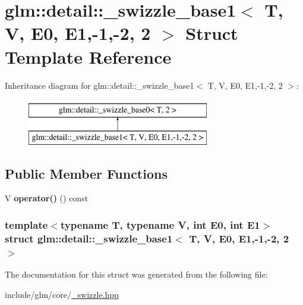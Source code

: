 \hypertarget{structglm_1_1detail_1_1__swizzle__base1_3_01T_00_01V_00_01E0_00_01E1_00-1_00-2_00_012_01_4}{\section{glm\-:\-:detail\-:\-:\-\_\-swizzle\-\_\-base1$<$ \-T, \-V, \-E0, \-E1,-\/1,-\/2, 2 $>$ \-Struct \-Template \-Reference}
\label{structglm_1_1detail_1_1__swizzle__base1_3_01T_00_01V_00_01E0_00_01E1_00-1_00-2_00_012_01_4}
}
\-Inheritance diagram for glm\-:\-:detail\-:\-:\-\_\-swizzle\-\_\-base1$<$ \-T, \-V, \-E0, \-E1,-\/1,-\/2, 2 $>$\-:\begin{figure}[H]
\begin{center}
\leavevmode
\includegraphics[height=2.000000cm]{structglm_1_1detail_1_1__swizzle__base1_3_01T_00_01V_00_01E0_00_01E1_00-1_00-2_00_012_01_4}
\end{center}
\end{figure}
\subsection*{\-Public \-Member \-Functions}
\begin{DoxyCompactItemize}
\item 
\hypertarget{structglm_1_1detail_1_1__swizzle__base1_3_01T_00_01V_00_01E0_00_01E1_00-1_00-2_00_012_01_4_ae62c208420fe971c7203cbea2a7b7481}{\-V {\bfseries operator()} () const }\label{structglm_1_1detail_1_1__swizzle__base1_3_01T_00_01V_00_01E0_00_01E1_00-1_00-2_00_012_01_4_ae62c208420fe971c7203cbea2a7b7481}

\end{DoxyCompactItemize}
\subsubsection*{template$<$typename T, typename V, int \-E0, int \-E1$>$ struct glm\-::detail\-::\-\_\-swizzle\-\_\-base1$<$ T, V, E0, E1,-\/1,-\/2, 2 $>$}



\-The documentation for this struct was generated from the following file\-:\begin{DoxyCompactItemize}
\item 
include/glm/core/\hyperlink{__swizzle_8hpp}{\-\_\-swizzle.\-hpp}\end{DoxyCompactItemize}
